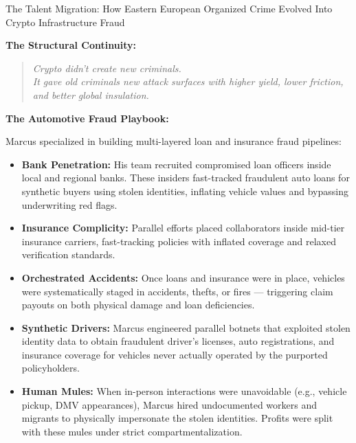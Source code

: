 \begin{HistoricalSidebar}{The Talent Migration: How Eastern European Organized Crime Evolved Into Crypto Infrastructure Fraud}
    \medskip
    
    \textbf{The Structural Continuity:}
    
    \begin{quote}
    \emph{Crypto didn’t create new criminals.} \\
    \emph{It gave old criminals new attack surfaces with higher yield, lower friction, and better global insulation.}
    \end{quote}
    
\end{HistoricalSidebar}




\textbf{The Automotive Fraud Playbook:}

Marcus specialized in building multi-layered loan and insurance fraud pipelines:

\begin{itemize}
  \item \textbf{Bank Penetration:}  
  His team recruited compromised loan officers inside local and regional banks. These insiders fast-tracked fraudulent auto loans for synthetic buyers using stolen identities, inflating vehicle values and bypassing underwriting red flags.
  
  \item \textbf{Insurance Complicity:}  
  Parallel efforts placed collaborators inside mid-tier insurance carriers, fast-tracking policies with inflated coverage and relaxed verification standards.
  
  \item \textbf{Orchestrated Accidents:}  
  Once loans and insurance were in place, vehicles were systematically staged in accidents, thefts, or fires — triggering claim payouts on both physical damage and loan deficiencies.

  \item \textbf{Synthetic Drivers:}  
  Marcus engineered parallel botnets that exploited stolen identity data to obtain fraudulent driver’s licenses, auto registrations, and insurance coverage for vehicles never actually operated by the purported policyholders.

  \item \textbf{Human Mules:}  
  When in-person interactions were unavoidable (e.g., vehicle pickup, DMV appearances), Marcus hired undocumented workers and migrants to physically impersonate the stolen identities. Profits were split with these mules under strict compartmentalization.
\end{itemize}

